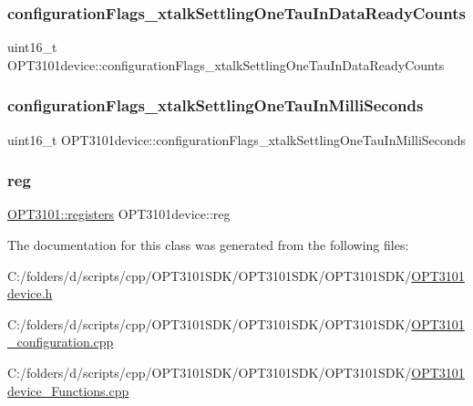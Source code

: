 \subsubsection{\texorpdfstring{configuration\+Flags\+\_\+xtalk\+Settling\+One\+Tau\+In\+Data\+Ready\+Counts}{configurationFlags\_xtalkSettlingOneTauInDataReadyCounts}}
{\footnotesize\ttfamily uint16\+\_\+t O\+P\+T3101device\+::configuration\+Flags\+\_\+xtalk\+Settling\+One\+Tau\+In\+Data\+Ready\+Counts}

\mbox{\label{class_o_p_t3101device_a6518ba457e85d945792dbd80114e40d8}} 
\subsubsection{\texorpdfstring{configuration\+Flags\+\_\+xtalk\+Settling\+One\+Tau\+In\+Milli\+Seconds}{configurationFlags\_xtalkSettlingOneTauInMilliSeconds}}
{\footnotesize\ttfamily uint16\+\_\+t O\+P\+T3101device\+::configuration\+Flags\+\_\+xtalk\+Settling\+One\+Tau\+In\+Milli\+Seconds}

\mbox{\label{class_o_p_t3101device_a702787c83b68e71d5db5ec8cdac57ba0}} 
\subsubsection{\texorpdfstring{reg}{reg}}
{\footnotesize\ttfamily \mbox{\hyperlink{class_o_p_t3101_1_1registers}{O\+P\+T3101\+::registers}} O\+P\+T3101device\+::reg}



The documentation for this class was generated from the following files\+:\begin{DoxyCompactItemize}
\item 
C\+:/folders/d/scripts/cpp/\+O\+P\+T3101\+S\+D\+K/\+O\+P\+T3101\+S\+D\+K/\+O\+P\+T3101\+S\+D\+K/\mbox{\hyperlink{_o_p_t3101device_8h}{O\+P\+T3101device.\+h}}\item 
C\+:/folders/d/scripts/cpp/\+O\+P\+T3101\+S\+D\+K/\+O\+P\+T3101\+S\+D\+K/\+O\+P\+T3101\+S\+D\+K/\mbox{\hyperlink{_o_p_t3101__configuration_8cpp}{O\+P\+T3101\+\_\+configuration.\+cpp}}\item 
C\+:/folders/d/scripts/cpp/\+O\+P\+T3101\+S\+D\+K/\+O\+P\+T3101\+S\+D\+K/\+O\+P\+T3101\+S\+D\+K/\mbox{\hyperlink{_o_p_t3101device___functions_8cpp}{O\+P\+T3101device\+\_\+\+Functions.\+cpp}}\end{DoxyCompactItemize}
